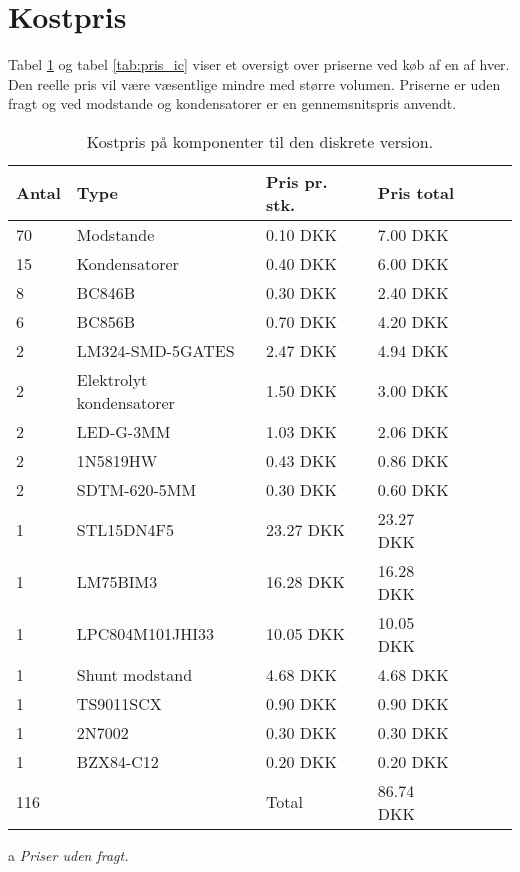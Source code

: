 \section{Kostpris} \label{sec:sammenligning_kostpris}

Tabel \ref{tab:pris_diskret} og tabel \ref{tab:pris_ic} viser et oversigt over priserne ved køb af en af hver. Den reelle pris vil være væsentlige mindre med større volumen. Priserne er uden fragt og ved modstande og kondensatorer er en gennemsnitspris anvendt.

\begin{table}[h!]
	\small
	\centering
	\begin{threeparttable}
		\begin{tabular}{ l l l l l l l }
			\toprule
			\multicolumn{1}{l}{\textbf{Antal}}          &
			\multicolumn{1}{l}{\textbf{Type}}           &
			\multicolumn{1}{l}{\textbf{Pris pr. stk.}}  &
			\multicolumn{1}{l}{\textbf{Pris total}}   \\ 
			\hline
			70 &  Modstande                 &  0.10 DKK   &  7.00 DKK  \\
			15 &  Kondensatorer             &  0.40 DKK   &  6.00 DKK  \\
		    8  &  BC846B                    &  0.30 DKK   &  2.40 DKK  \\
		    6  &  BC856B                    &  0.70 DKK   &  4.20 DKK  \\
		    2  &  LM324-SMD-5GATES          &  2.47 DKK   &  4.94 DKK  \\ 
			2  &  Elektrolyt kondensatorer  &  1.50 DKK   &  3.00 DKK  \\
			2  &  LED-G-3MM                 &  1.03 DKK   &  2.06 DKK  \\
	 	    2  &  1N5819HW                  &  0.43 DKK   &  0.86 DKK  \\
	 	    2  &  SDTM-620-5MM              &  0.30 DKK   &  0.60 DKK  \\ 
		    1  &  STL15DN4F5                & 23.27 DKK   & 23.27 DKK  \\
		    1  &  LM75BIM3                  & 16.28 DKK   & 16.28 DKK  \\
		   	1  &  LPC804M101JHI33           & 10.05 DKK   & 10.05 DKK  \\
		   	1  &  Shunt modstand            &  4.68 DKK   &  4.68 DKK  \\
		   	1  &  TS9011SCX                 &  0.90 DKK   &  0.90 DKK  \\
  			1  &  2N7002                    &  0.30 DKK   &  0.30 DKK  \\
	  	    1  &  BZX84-C12                 &  0.20 DKK   &  0.20 DKK  \\
	        \hline
	  	   116 &                            & Total       & 86.74 DKK  \\  
			\hline
			\bottomrule
		\end{tabular}
		\begin{tablenotes}
		\item[a] \textit{Priser uden fragt.}
		\end{tablenotes}
		\caption{Kostpris på komponenter til den diskrete version.}
		\label{tab:pris_diskret}
	\end{threeparttable}
\end{table} 
